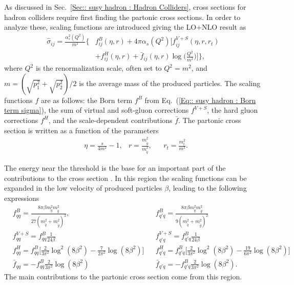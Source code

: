 \documentclass[twoside,english]{uiofysmaster}
\begin{document}
{As discussed in Sec.~\ref{Sec:: susy hadron : Hadron Colliders}, cross sections for hadron colliders require first finding the partonic cross sections. In order to analyze these, scaling functions are introduced \cite{beenakker1997squark} giving the LO+NLO result as
\begin{align}\label{Eq:: susy hadron : Partonic cross section LO+NLO}
\hat{\sigma}_{ij} = \frac{\alpha_s^2(Q^2)}{m^2} \Big\{ &f^B_{ij}(\eta, r) + 4 \pi \alpha_s (Q^2) \Bigg[ f_{ij}^{V+S}(\eta, r, r_t) \nonumber \\ & + f_{ij}^H (\eta, r) + \bar{f}_{ij} (\eta, r) \log \Bigg( \frac{Q^2}{m^2}\Bigg) \Bigg] \Big\},
\end{align}
where $Q^2$ is the renormalization scale, often set to $Q^2 = m^2$, and $m = (\sqrt{p_1^2} + \sqrt{p_2^2})/2$ is the average mass of the produced particles. The scaling functions $f$ are as follows: the Born term $f^B$ from Eq.~(\ref{Eq:: susy hadron : Born term sigma}), the sum of virtual and soft-gluon corrections $f^{V+S}$, the hard gluon corrections $f^H$, and the scale-dependent contributions $\bar{f}$. The partonic cross section is written as a function of the parameters
\begin{align}
&\eta = \frac{s}{4m^2} -1, &r= \frac{m_{\widetilde{g}}^2}{m_{\widetilde{q}}^2}, &&r_t = \frac{m_t^2}{m^2}.
\end{align}

The energy near the threshold is the base for an important part of the contributions to the cross section \cite{beenakker1997squark}. In this region the scaling functions can be expanded in the low velocity of produced particles $\beta$, leading to the following expressions \cite{beenakker1997squark}
\begin{align}
&f_{qq}^B = \frac{8 \pi \beta m_{\widetilde{q}}^2 m_{\widetilde{g}}^2}{27(m_{\widetilde{q}}^2 + m_{\widetilde{g}}^2)^2}, &&f_{q'q}^B = \frac{8 \pi \beta m_{\widetilde{q}}^2 m_{\widetilde{g}}^2}{9(m_{\widetilde{q}}^2 + m_{\widetilde{g}}^2)^2} \nonumber \\
& f_{qq}^{V+S} = f_{qq}^B \frac{1}{24 \beta} && f_{q'q}^{V+S} = f_{q'q}^B \frac{1}{24 \beta} \nonumber \\
&f_{qq}^H = f_{qq}^B \Big[\frac{2}{3 \pi^2} \log^2(8 \beta^2) - \frac{7}{2 \pi^2} \log (8 \beta^2) \Big] &&f_{q'q}^H = f_{q'q}^B \Big[\frac{2}{3 \pi^2} \log^2(8 \beta^2) - \frac{19}{6 \pi^2} \log (8 \beta^2) \Big] \nonumber \\
& \bar{f}_{qq} = - f_{qq}^B \frac{2}{3 \pi^2} \log (8 \beta^2) &&\bar{f}_{q'q} = - f_{q'q}^B \frac{2}{3 \pi^2} \log (8 \beta^2).\label{Eq:: susy hadron : Scaling functions near threshold}
\end{align}
The main contributions to the partonic cross section come from this region.

}
\end{document}
